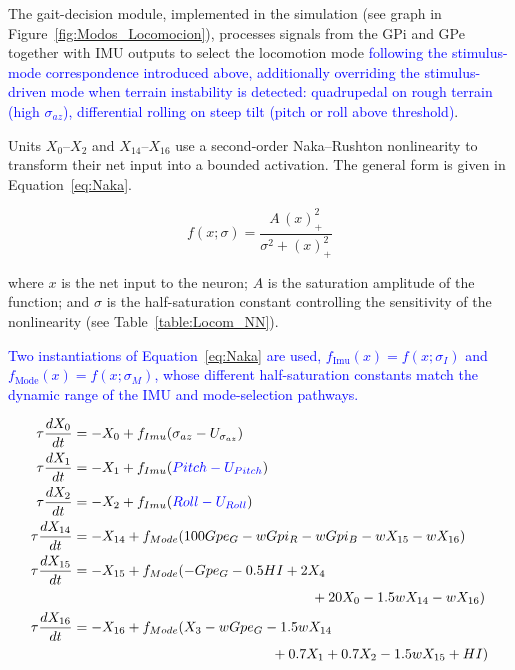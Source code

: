 \documentclass[preprint,12pt]{elsarticle}
\newcommand{\revblue}[1]{\textcolor{blue}{#1}}
\begin{document}
The gait-decision module, implemented in the simulation (see graph in Figure~\ref{fig:Modos_Locomocion}), processes signals from the GPi and GPe together with IMU outputs to select the locomotion mode \revblue{following the stimulus-mode correspondence introduced above, additionally overriding the stimulus-driven mode when terrain instability is detected: quadrupedal on rough terrain (high $\sigma_{az}$), differential rolling on steep tilt (pitch or roll above threshold)}.

Units $X_0$--$X_2$ and $X_{14}$--$X_{16}$ use a second-order Naka--Rushton nonlinearity to transform their net input into a bounded activation. The general form is given in Equation~\eqref{eq:Naka}.

\begin{equation}
f(x;\sigma) = \frac{A\,(x)_+^2}{\sigma^2 + (x)_+^2}
\label{eq:Naka}
\end{equation}

where $x$ is the net input to the neuron; $A$ is the saturation amplitude of the function; and $\sigma$ is the half-saturation constant controlling the sensitivity of the nonlinearity (see Table~\ref{table:Locom_NN}).

\revblue{Two instantiations of Equation~\eqref{eq:Naka} are used, $f_{\mathrm{Imu}}(x) = f(x;\sigma_I)$ and $f_{\mathrm{Mode}}(x) = f(x;\sigma_M)$, whose different half-saturation constants match the dynamic range of the IMU and mode-selection pathways.} 

\begin{align}
\tau \frac{dX_0}{dt} &= -X_0 + f_{Imu}(\sigma_{az} - U_{\sigma_{az}})
\label{eq:Z0}
\\
\tau \frac{dX_1}{dt} &= -X_1 +  f_{Imu}( \revblue{Pitch - U_{Pitch}})
\\
\tau \frac{dX_2}{dt} &= -X_2 +  f_{Imu}( \revblue{Roll - U_{Roll}})
\\
\tau \frac{dX_{14}}{dt} &= -X_{14} +  f_{Mode}(100 Gpe_G - w Gpi_R  - w Gpi_B - w X_{15} - w X_{16})
\\
\tau \frac{dX_{15}}{dt} &= -X_{15} +f_{Mode}( -Gpe_G - 0.5HI + 2X_4 \notag\\
&\hspace*{6cm}+ 20X_0 - 1.5wX_{14} - wX_{16})
\\
\tau \frac{dX_{16}}{dt} &= -X_{16} +  f_{Mode}( X_3 - wGpe_G - 1.5wX_{14}\notag\\
&\hspace{5cm}+ 0.7X_1 + 0.7X_2 - 1.5wX_{15} + HI)
\label{eq:Z16}
\end{align}
\end{document}
